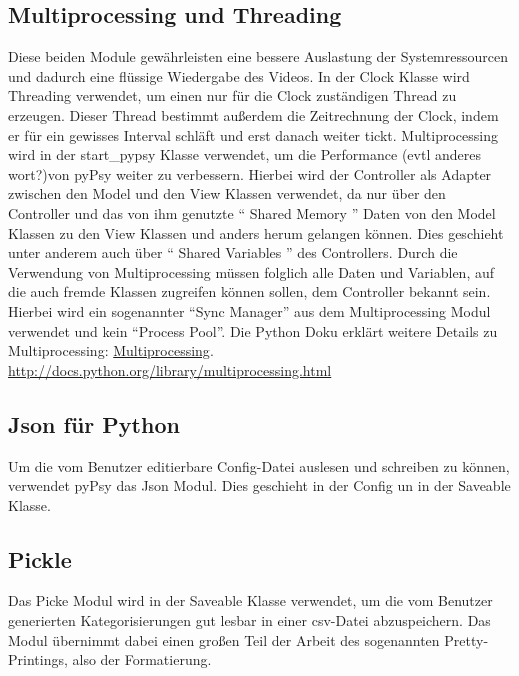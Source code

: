 \documentclass[a4paper,draft]{scrartcl}
\begin{document}
\subsection{Multiprocessing und Threading}
Diese beiden Module gewährleisten eine bessere Auslastung der Systemressourcen und dadurch eine flüssige Wiedergabe des Videos. 
In der Clock Klasse wird Threading verwendet, um einen nur für die Clock zuständigen Thread zu erzeugen. Dieser Thread bestimmt außerdem die Zeitrechnung der Clock, indem er für ein gewisses Interval schläft und erst danach weiter tickt. 
Multiprocessing wird in der start\_pypsy Klasse verwendet, um die Performance (evtl anderes wort?)von pyPsy weiter zu verbessern. Hierbei wird der Controller als Adapter zwischen den Model und den View Klassen verwendet, da nur über den Controller und das von ihm genutzte "` Shared Memory "' Daten von den Model Klassen zu den View Klassen und anders herum gelangen können. Dies geschieht unter anderem auch über "` Shared Variables "' des Controllers. 
Durch die Verwendung von Multiprocessing müssen folglich alle Daten und Variablen, auf die auch fremde Klassen zugreifen können sollen, dem Controller bekannt sein. Hierbei wird ein sogenannter "`Sync Manager"' aus dem Multiprocessing Modul verwendet und kein "`Process Pool"'.
Die Python Doku erklärt weitere Details zu Multiprocessing: \href{http://docs.python.org/library/multiprocessing.html}
{Multiprocessing}.
\url{http://docs.python.org/library/multiprocessing.html}
\subsection{Json für Python}
Um die vom Benutzer editierbare Config-Datei auslesen und schreiben zu können, verwendet pyPsy das Json Modul. Dies geschieht in der Config un in der Saveable Klasse. 

\subsection{Pickle}
Das Picke Modul wird in der Saveable Klasse verwendet, um die vom Benutzer generierten Kategorisierungen gut lesbar in einer csv-Datei abzuspeichern. Das Modul übernimmt dabei einen großen Teil der Arbeit des sogenannten Pretty-Printings, also der Formatierung.
\end{document}

